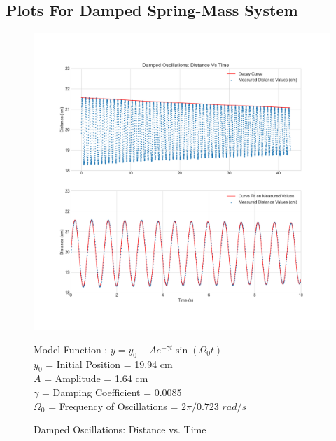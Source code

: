 \documentclass[letterpaper,12pt]{article}
\begin{document}
\subsection{Plots For Damped Spring-Mass System}
\begin{figure}[H]
  \centering
  \includegraphics[width=0.95\linewidth]{../Pankaj/lab3_damped_distance_vs_time.png}    
  \begin{center}
    Model Function : $y = y_0 + A e^{-\gamma t} \sin(\Omega_0 t)$ \\
    $y_0$ = Initial Position  = 19.94 cm \\
    $A$ = Amplitude = 1.64 cm\\
    $\gamma$ = Damping Coefficient = 0.0085 \\
    $\Omega_0$ = Frequency of  Oscillations = $2\pi / 0.723$ $rad/s$ \\      
  \end{center}
  \caption{Damped Oscillations: Distance vs. Time}
  \label{damped-d-t-plot}
\end{figure}
\end{document}

